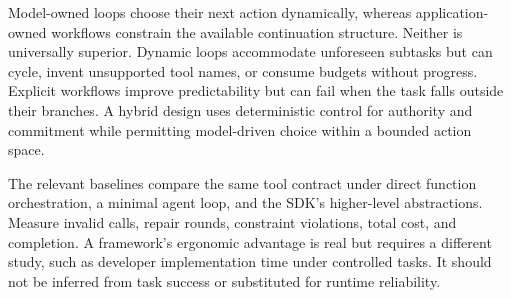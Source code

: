 Model-owned loops choose their next action dynamically, whereas application-owned workflows constrain the available continuation structure. Neither is universally superior. Dynamic loops accommodate unforeseen subtasks but can cycle, invent unsupported tool names, or consume budgets without progress. Explicit workflows improve predictability but can fail when the task falls outside their branches. A hybrid design uses deterministic control for authority and commitment while permitting model-driven choice within a bounded action space.

The relevant baselines compare the same tool contract under direct function orchestration, a minimal agent loop, and the SDK's higher-level abstractions. Measure invalid calls, repair rounds, constraint violations, total cost, and completion. A framework's ergonomic advantage is real but requires a different study, such as developer implementation time under controlled tasks. It should not be inferred from task success or substituted for runtime reliability.

